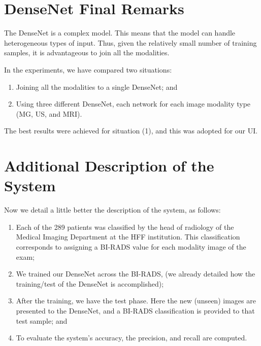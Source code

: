 \section{DenseNet Final Remarks}
\label{sec:app004006}

The DenseNet is a complex model.
This means that the model can handle heterogeneous types of input.
Thus, given the relatively small number of training samples, it is advantageous to join all the modalities.

\vspace{2.50mm}

\noindent
In the experiments, we have compared two situations:

\vspace{1.50mm}

\begin{enumerate}
\item Joining all the modalities to a single DenseNet; and
\item Using three different DenseNet, each network for each image modality type (\ac{MG}, \ac{US}, and \ac{MRI}).
\end{enumerate}

\vspace{1.50mm}

The best results were achieved for situation (1), and this was adopted for our \ac{UI}.

\section{Additional Description of the System}
\label{sec:app004007}

\vspace{1.50mm}

\noindent
Now we detail a little better the description of the system, as follows:

\begin{enumerate}
\item Each of the 289 patients was classified by the head of radiology of the Medical Imaging Department at the \ac{HFF} institution.
This classification corresponds to assigning a \ac{BI-RADS} value for each modality image of the exam;
\item We trained our DenseNet across the \ac{BI-RADS}, (we already detailed how the  training/test of the DenseNet is accomplished);
\item After the training, we have the test phase.
Here the new (unseen) images are presented to the DenseNet, and a \ac{BI-RADS} classification is provided to that test sample; and
\item To evaluate the system's accuracy, the precision, and recall are computed.
\end{enumerate}

